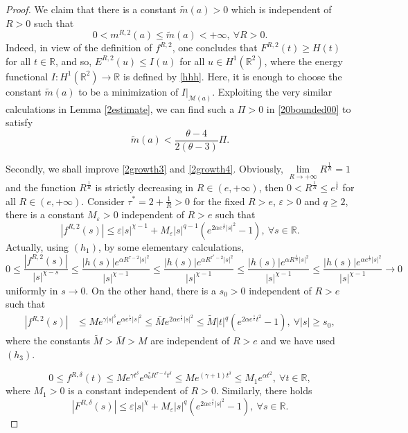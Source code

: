 \documentclass[11pt]{amsart}
\numberwithin{equation}{section}
\theoremstyle{definition}
\newcommand{\R}{\mathbb{R}}
\begin{document}
\begin{proof}
We claim that there is a constant $\tilde{m}(a)>0$ which is independent of $R>0$ such that
\begin{equation}\label{2bounded4}
0<m^{R,{2}}(a)\leq \tilde{m}(a)<+\infty,~\forall R>0.
\end{equation}
Indeed, in view of the definition of $f^{R,2}$, one concludes that $F^{R,2}(t)\geq H(t)$
for all $t\in\R$, and so, $E^{R,2}(u)\leq I(u)$ for all $u\in H^1(\R^2)$, where the
energy functional $I:H^1(\R^2)\to\R$ is defined by \eqref{hhh}.
Here, it is enough to choose the constant $\tilde{m}(a)$ to be a minimization of $I|_{\mathcal{M}(a)}$.
Exploiting the very similar calculations in Lemma \ref{2estimate}, we can find such a $\Pi>0$ in \eqref{20bounded00}
to satisfy
\begin{equation}\label{2bounded4444}
\tilde{m}(a)<\frac{\theta-4}{ 2(\theta-3)} \Pi.
\end{equation}

Secondly, we shall improve \eqref{2growth3} and \eqref{2growth4}.
Obviously, $\lim\limits_{R\to+\infty}R^{\frac{1}{R}}=1$
and the function $R^{\frac{1}{R}}$ is strictly decreasing in $R\in(e,+\infty)$,
then $0<R^{\frac{1}{R}}\leq e^{\frac{1}{e}}$ for all $R\in(e,+\infty)$. Consider
$\tau^*=2+\frac{1}{R}>0$ for the fixed $R>e$, $\varepsilon>0$ and $q\geq2$, there is a
  constant $M_\varepsilon>0$ independent of $R>e$ such that
\begin{equation}\label{22growth3}
  |f^{R,2}(s)|\leq \varepsilon |s|^{\chi-1}+M_\varepsilon|s|^{q-1}(e^{2\alpha e^{\frac1e} |s|^2}-1),~\forall s\in\R.
\end{equation}
Actually, using $(h_1)$, by some elementary calculations,
\[
0\leq \frac{ |f^{R,2}(s)| }{|s|^{\chi-s}}\leq \frac{ |h(s)|e^{\alpha R^{\tau-2}|s|^2} }{|s|^{\chi-1}}
\leq \frac{ |h(s)|e^{\alpha R^{\tau^*-2}|s|^2} }{|s|^{\chi-1}}
\leq \frac{ |h(s)|e^{\alpha R^{\frac1R}|s|^2} }{|s|^{\chi-1}}
\leq \frac{ |h(s)|e^{\alpha e^{\frac1e}|s|^2} }{|s|^{\chi-1}}\to0
\]
uniformly in $s\to0$. On the other hand, there is a $s_0>0$ independent of $R>e$ such that
\begin{align*}
|f^{R,2}(s)| &
\leq Me^{\gamma |s|^{\delta}}e^{\alpha e^{\frac1e} |s|^{2}}
\leq  \bar{M}   e^{2\alpha e^{\frac1e} |s|^{2}}
 \leq   \tilde{M}  |t|^q(e^{2\alpha e^{\frac1e} t^{2}} -1), ~\forall |s|\geq s_0,
\end{align*}
where the constants $\tilde{M}>\bar{M}>M$ are independent of $R>e$ and we have used $(h_3)$.


\[
 0\leq f^{R,\delta}(t)\leq Me^{\gamma t^\delta}e^{\alpha_0^* R^{\tau-\delta} t^\delta}
\leq M e^{(\gamma + 1)t^\delta} \leq M_1e^{\alpha t^2}, ~\forall t\in\R,
\]
where $M_1>0$ is a constant independent of $R>0$.
Similarly, there holds
\begin{equation}\label{22growth4}
  |F^{R,\delta}(s)|\leq \varepsilon |s|^{\chi}+M_\varepsilon|s|^{q}(e^{2\alpha e^{\frac1e} |s|^2}-1),~\forall s\in\R.
\end{equation}


\end{proof}
\end{document}

